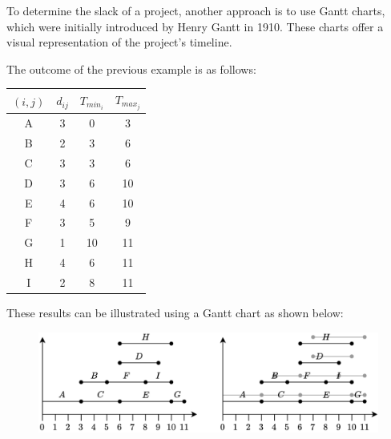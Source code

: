 To determine the slack of a project, another approach is to use Gantt charts, which were initially introduced by Henry Gantt in 1910. 
These charts offer a visual representation of the project's timeline.
\begin{example}
    The outcome of the previous example is as follows:
    \begin{table}[H]
        \centering
        \begin{tabular}{cccc}
        \hline
        $(i,j)$ & $d_{ij}$ & $T_{min_i}$ & $T_{max_j}$ \\ \hline
        A       & 3        & 0           & 3           \\
        B       & 2        & 3           & 6           \\
        C       & 3        & 3           & 6           \\
        D       & 3        & 6           & 10          \\
        E       & 4        & 6           & 10          \\
        F       & 3        & 5           & 9           \\
        G       & 1        & 10          & 11          \\
        H       & 4        & 6           & 11          \\
        I       & 2        & 8           & 11          \\ \hline
        \end{tabular}
    \end{table}
    These results can be illustrated using a Gantt chart as shown below:
    \begin{figure}[H]
        \centering
        \includegraphics[width=0.5\linewidth]{images/Gantt.png}
    \end{figure}
\end{example}